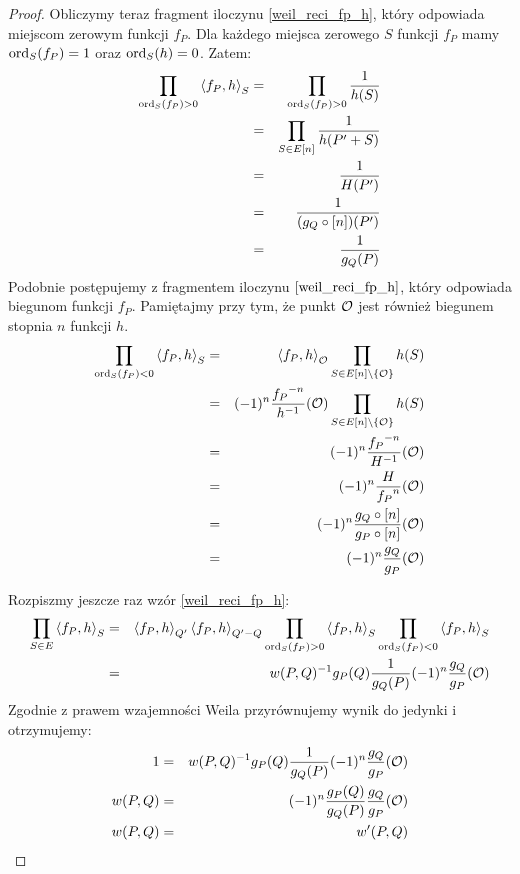 \begin{proof}
Obliczymy teraz fragment iloczynu \ref{weil_reci_fp_h},
który odpowiada miejscom zerowym funkcji $f_P$.
Dla każdego miejsca zerowego $S$ funkcji $f_P$
mamy $\operatorname{ord}_S(f_P) = 1$ oraz $\operatorname{ord}_S(h) = 0$.
Zatem:
\begin{eqnarray*}
\prod_{\operatorname{ord}_S(f_P) > 0} \left\langle f_P , h \right\rangle_{S}
& = & \prod_{\operatorname{ord}_S(f_P) > 0} \frac{1}{h(S)} \\
& = & \prod_{S \in E[n]} \frac{1}{h(P' + S)} \\
& = & \frac{1}{H(P')} \\
& = & \frac{1}{(g_Q \circ [n])(P')} \\
& = & \frac{1}{g_Q(P)}
\end{eqnarray*}
Podobnie postępujemy z fragmentem iloczynu $\ref{weil_reci_fp_h}$,
który odpowiada biegunom funkcji $f_P$. Pamiętajmy przy tym,
że punkt $\mathcal{O}$ jest również biegunem stopnia $n$ funkcji $h$.
\begin{eqnarray*}
\prod_{\operatorname{ord}_S(f_P) < 0} \left\langle f_P , h \right\rangle_{S}
& = & \left\langle f_P , h \right\rangle_{\mathcal{O}}
      \prod_{S \in E[n] \setminus \{\mathcal{O}\}} h(S) \\
& = & (-1)^{n}\frac{{f_P}^{-n}}{h^{-1}}(\mathcal{O})
      \prod_{S \in E[n] \setminus \{\mathcal{O}\}} h(S) \\
& = & (-1)^{n}\frac{{f_P}^{-n}}{H^{-1}}(\mathcal{O}) \\
& = & (-1)^{n}\frac{H}{{f_P}^n}(\mathcal{O}) \\
& = & (-1)^{n}\frac{g_Q \circ [n]}{g_P \circ [n]}(\mathcal{O}) \\
& = & (-1)^{n}\frac{g_Q}{g_P}(\mathcal{O})
\end{eqnarray*}

Rozpiszmy jeszcze raz wzór \ref{weil_reci_fp_h}:
\begin{eqnarray*}
\prod_{S \in E} \left\langle f_P , h \right\rangle_{S}
& = & \left\langle f_P , h \right\rangle_{Q'} \left\langle f_P , h \right\rangle_{Q' - Q}
      \prod_{\operatorname{ord}_S(f_P) > 0} \left\langle f_P , h \right\rangle_{S}
      \prod_{\operatorname{ord}_S(f_P) < 0} \left\langle f_P , h \right\rangle_{S} \\
& = & w(P, Q)^{-1} g_P(Q) \frac{1}{g_Q(P)} (-1)^n\frac{g_Q}{g_P}(\mathcal{O})
\end{eqnarray*}
Zgodnie z prawem wzajemności Weila przyrównujemy wynik do jedynki
i otrzymujemy:
\begin{eqnarray*}
1 & = & w(P, Q)^{-1} g_P(Q) \frac{1}{g_Q(P)} (-1)^n\frac{g_Q}{g_P}(\mathcal{O}) \\
w(P, Q) & = & (-1)^n \frac{g_P(Q)}{g_Q(P)} \frac{g_Q}{g_P}(\mathcal{O}) \\
w(P, Q) & = & w'(P, Q)
\end{eqnarray*}
\end{proof}
